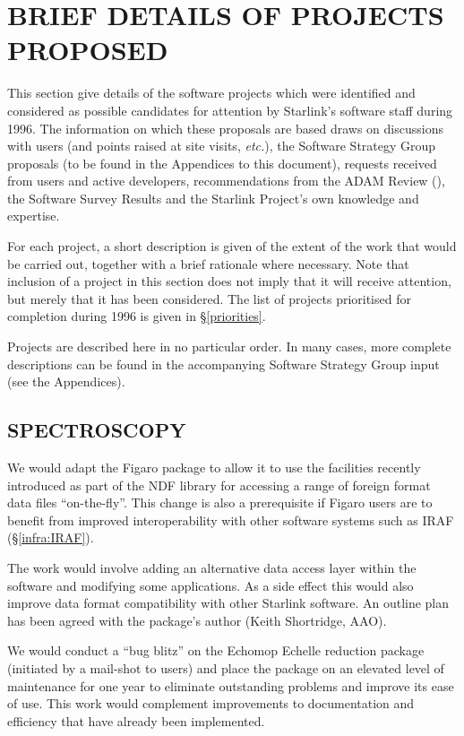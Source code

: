 \section{\label{details}BRIEF DETAILS OF PROJECTS PROPOSED}

This section give details of the software projects which were
identified and considered as possible candidates for attention by
Starlink's software staff during 1996. The information on which these
proposals are based draws on discussions with users (and points raised
at site visits, {\em etc.}), the Software Strategy Group proposals (to
be found in the Appendices to this document), requests received from
users and active developers, recommendations from the ADAM Review
(), the Software Survey Results and the Starlink
Project's own knowledge and expertise.

For each project, a short description is given of the extent of the
work that would be carried out, together with a brief rationale where
necessary. Note that inclusion of a project in this section does not
imply that it will receive attention, but merely that it has been
considered. The list of projects prioritised for completion during
1996 is given in \S\ref{priorities}.

Projects are described here in no particular order. In many cases,
more complete descriptions can be found in the accompanying Software
Strategy Group input (see the Appendices).

\subsection{SPECTROSCOPY}

{We would adapt the Figaro package to allow it to use the facilities
recently introduced as part of the NDF library for accessing a range
of foreign format data files ``on-the-fly''. This change is also a
prerequisite if Figaro users are to benefit from improved
interoperability with other software systems such as IRAF
(\S\ref{infra:IRAF}).

The work would involve adding an alternative data access layer within
the software and modifying some applications. As a side effect this
would also improve data format compatibility with other Starlink
software. An outline plan has been agreed with the package's author
(Keith Shortridge, AAO).}

{We would conduct a ``bug blitz'' on the Echomop Echelle reduction
package (initiated by a mail-shot to users) and place the package on
an elevated level of maintenance for one year to eliminate outstanding
problems and improve its ease of use. This work would complement
improvements to documentation and efficiency that have already been
implemented.}

